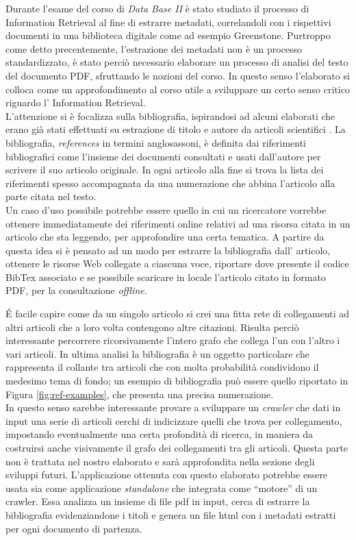 Durante l'esame del corso di \textit{Data Base II} è stato studiato il processo di Information Retrieval al fine di estrarre metadati, correlandoli con i rispettivi documenti in una biblioteca digitale come ad esempio Greenstone. Purtroppo come detto precentemente, l'estrazione dei metadati non è un processo standardizzato, è stato perciò necessario elaborare un processo di analisi del testo del documento PDF, sfruttando le nozioni del corso. In questo senso l'elaborato si colloca come un approfondimento al corso utile a sviluppare un certo senso critico riguardo l' Information Retrieval.\\
L'attenzione si è focalizza sulla bibliografia, ispirandosi ad alcuni elaborati che erano già stati effettuati su estrazione di titolo e autore da articoli scientifici \cite{Tarocchi}. La bibliografia, \textit{references} in  termini anglosassoni, è definita dai riferimenti bibliografici come l'insieme dei documenti consultati e usati dall'autore per scrivere il suo articolo originale. In ogni articolo alla fine si trova la lista dei riferimenti spesso accompagnata da una numerazione che abbina l'articolo alla parte citata nel testo.
\\ 
Un caso d'uso possibile potrebbe essere quello in cui un ricercatore vorrebbe ottenere immediatamente dei riferimenti online relativi ad una risorsa citata in un articolo che sta leggendo, per approfondire una certa tematica. A partire da questa idea si è pensato ad un modo per estrarre la bibliografia dall' articolo, ottenere le risorse Web collegate a ciascuna voce, riportare dove presente il codice BibTex associato e se possibile scaricare in locale l'articolo citato in formato PDF, per la consultazione \textit{offline}.

\'E facile capire come da un singolo articolo si crei una fitta rete di collegamenti ad altri articoli che a loro volta contengono altre citazioni. Risulta perciò interessante percorrere ricorsivamente l'intero grafo che collega l'un con l'altro i vari articoli. In ultima analisi la bibliografia è un oggetto particolare che rappresenta il collante tra articoli che con molta probabilità condividono il medesimo tema di fondo; un esempio di bibliografia può essere quello riportato in Figura \ref{fig:ref-examples}, che presenta una precisa numerazione.
\\
In questo senso sarebbe interessante provare a sviluppare un \textit{crawler} che dati in input una serie di articoli cerchi di indicizzare quelli che trova per collegamento, impostando eventualmente una certa profondità di ricerca, in maniera da costruirsi anche visivamente il grafo dei collegamenti tra gli articoli. Questa parte non è trattata nel nostro elaborato e sarà approfondita nella sezione degli sviluppi futuri. L'applicazione ottenuta con questo elaborato potrebbe essere usata sia come applicazione \textit{standalone} che integrata come ``motore'' di un crawler. Essa analizza un insieme di file pdf in input, cerca di estrarre la bibliografia evidenziandone i titoli e genera un file html con i metadati estratti per ogni documento di partenza. 


